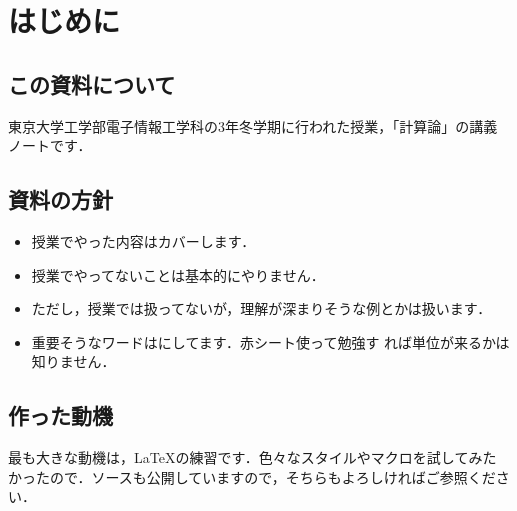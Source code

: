 
\chapter{はじめに}

\section{この資料について}
東京大学工学部電子情報工学科の3年冬学期に行われた授業，「計算論」の講義
ノートです．

\section{資料の方針}
\begin{itemize}
 \item 授業でやった内容はカバーします．
 \item 授業でやってないことは基本的にやりません．
 \item ただし，授業では扱ってないが，理解が深まりそうな例とかは扱います．
 \item 重要そうなワードはにしてます．赤シート使って勉強す
       れば単位が来るかは知りません．
\end{itemize}

\section{作った動機}
最も大きな動機は，\LaTeX の練習です．色々なスタイルやマクロを試してみた
かったので．ソースも公開していますので，そちらもよろしければご参照くださ
い．
